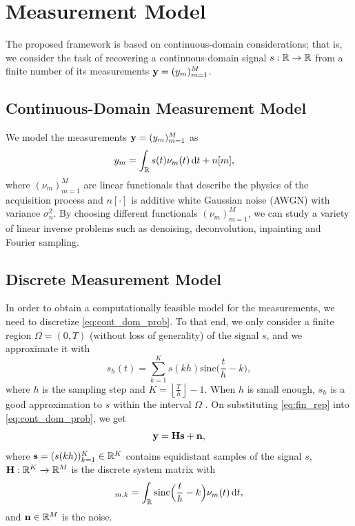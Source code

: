 \documentclass[journal]{IEEEtran}
\begin{document}
\section{Measurement Model}
The proposed framework is based on continuous-domain considerations; that is, we consider the task of recovering a continuous-domain signal $s:\mathbb{R} \rightarrow \mathbb{R}$ from a finite number of its measurements ${\bf{y}} = (y_m)_{m=1}^{M}$. 


\subsection{Continuous-Domain Measurement Model}
We model the measurements ${\bf{y}} = (y_m)_{m=1}^{M}$ as
\begin{align}\label{eq:cont_dom_prob}
    y_m &=  \int_{\mathbb{R}} s(t)\nu_m(t) \,\mathrm{d} t + n[m],
\end{align}
where $(\nu_m)_{m=1}^{M}$ are linear functionals that describe the physics of the acquisition process and $n[\cdot]$ is additive white Gaussian noise (AWGN) with variance $\sigma_{n}^{2}$. By choosing different functionals $(\nu_m)_{m=1}^{M}$, we can study a variety of linear inverse problems such as denoising, deconvolution, inpainting and Fourier sampling.


\subsection{Discrete Measurement Model}
In order to obtain a computationally feasible model for the measurements, we need to discretize \eqref{eq:cont_dom_prob}. To that end, we only consider a finite region $\Omega = (0,T)$ (without loss of generality) of the signal $s$, and we approximate it with
\begin{equation}\label{eq:fin_rep}
    s_h(t) = \sum\limits_{k=1}^{K} s(kh)\text{sinc}\Big(\frac{t}{h} - k\Big),
\end{equation}
where $h$ is the sampling step and $K = \left\lfloor \frac{T}{h} \right \rfloor - 1$. When $h$ is small enough, $s_h$ is a good approximation to $s$ within the interval $\Omega$ \cite{unser2000sampling}. On substituting \eqref{eq:fin_rep} into \eqref{eq:cont_dom_prob}, we get
\begin{equation}\label{eq:discrete_1}
    {\bf{y}} = {\bf{H}} {\bf{s}} + {\bf{n}},
\end{equation}
where ${\bf{s}} = (s(kh))_{k=1}^{K} \in \mathbb{R}^K$ contains equidistant samples of the signal $s$, ${\bf{H}}: \mathbb{R}^K \rightarrow \mathbb{R}^M$ is the discrete system matrix with
\begin{equation}
    [\M H]_{m,k} = \int_{\R} \text{sinc}\Big(\frac{t}{h} - k\Big) \nu_m(t) \ud t,
\end{equation}
and ${\bf{n}} \in \mathbb{R}^M$ is the noise.
\end{document}
